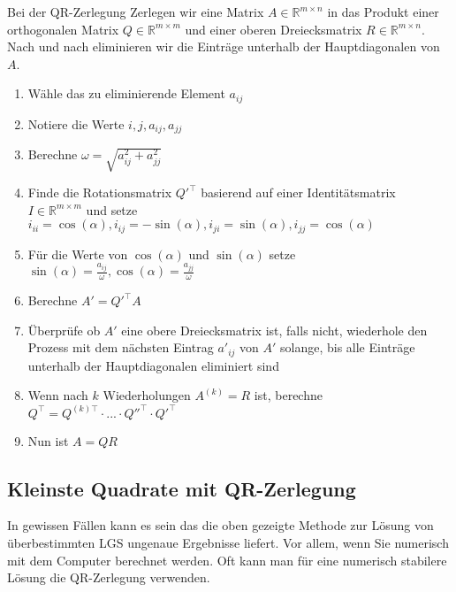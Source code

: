 \begin{tcolorbox}[colback=gray!30, colframe=gray!80, title=QR-Zerlegung]
    Bei der QR-Zerlegung Zerlegen wir eine Matrix \( A \in \mathbb{R}^{m \times n} \) in das Produkt einer orthogonalen Matrix \( Q \in \mathbb{R}^{m \times m} \) und einer oberen Dreiecksmatrix \( R \in \mathbb{R}^{m \times n} \). Nach und nach eliminieren wir die Einträge unterhalb der Hauptdiagonalen von \( A \). 
    \begin{enumerate}
        \item Wähle das zu eliminierende Element \( a_{ij} \)
        \item Notiere die Werte \( i, j, a_{ij}, a_{jj} \)
        \item Berechne \( \omega = \sqrt{a_{ij}^2 + a_{jj}^2} \)
        \item Finde die Rotationsmatrix \( Q'^\top \) basierend auf einer Identitätsmatrix \( I \in \mathbb{R}^{m \times m} \) und setze \( i_{ii} = \cos(\alpha), i_{ij} = -\sin(\alpha), i_{ji} = \sin(\alpha), i_{jj} = \cos(\alpha) \)
        \item Für die Werte von \( \cos(\alpha) \) und \( \sin(\alpha) \) setze \( \sin(\alpha) = \frac{a_{ij}}{\omega}, \cos(\alpha) = \frac{a_{jj}}{\omega} \)
        \item Berechne \( A' = Q'^\top A \)
        \item Überprüfe ob \( A' \) eine obere Dreiecksmatrix ist, falls nicht, wiederhole den Prozess mit dem nächsten Eintrag \( a'_{ij} \) von \( A' \) solange, bis alle Einträge unterhalb der Hauptdiagonalen eliminiert sind
        \item Wenn nach \( k \) Wiederholungen \( A^{(k)} = R \) ist, berechne \( Q^\top = Q^{(k) \top} \cdot ... \cdot Q''^\top \cdot Q'^\top \)
        \item Nun ist \(A = QR\)
    \end{enumerate}
\end{tcolorbox}

\subsection{Kleinste Quadrate mit QR-Zerlegung}

In gewissen Fällen kann es sein das die oben gezeigte Methode zur Lösung von überbestimmten LGS ungenaue Ergebnisse liefert. Vor allem, wenn Sie numerisch mit dem Computer berechnet werden. Oft kann man für eine numerisch stabilere Lösung die QR-Zerlegung verwenden. 

